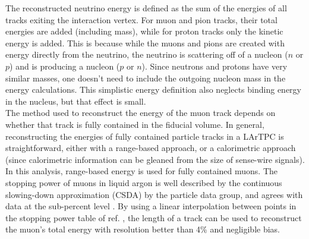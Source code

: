 The reconstructed neutrino energy is defined as the sum of the energies of all tracks exiting the interaction vertex. For muon and pion tracks, their total energies are added (including mass), while for proton tracks only the kinetic energy is added. This is because while the muons and pions are created with energy directly from the neutrino, the neutrino is scattering off of a nucleon ($n$ or $p$) and is producing a nucleon ($p$ or $n$). Since neutrons and protons have very similar masses, one doesn't need to include the outgoing nucleon mass in the energy calculations. This simplistic energy definition also neglects binding energy in the nucleus, but that effect is small.\\

The method used to reconstruct the energy of the muon track depends on whether that track is fully contained in the fiducial volume. In general, reconstructing the energies of fully contained particle tracks in a LArTPC is straightforward, either with a range-based approach, or a calorimetric approach (since calorimetric information can be gleaned from the size of sense-wire signals). In this analysis, range-based energy is used for fully contained muons. The stopping power of muons in liquid argon is well described by the continuous slowing-down approximation (CSDA) by the particle data group, and agrees with data at the sub-percent level \cite{MIPenergysource} \cite{PDG_spline_table}. By using a linear interpolation between points in the stopping power table of ref. \cite{PDG_spline_table}, the length of a track can be used to reconstruct the muon's total energy with resolution better than 4\% and negligible bias.\\

